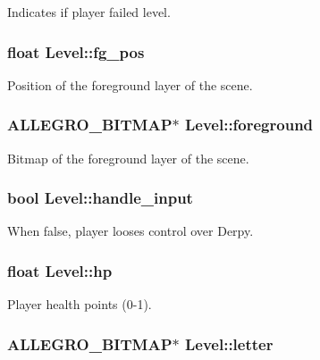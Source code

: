 \-Indicates if player failed level. \hypertarget{structLevel_a665bb93951ab6b7a91543712152a3acf}{
\subsubsection[{fg\-\_\-pos}]{\setlength{\rightskip}{0pt plus 5cm}float {\bf \-Level\-::fg\-\_\-pos}}}\label{structLevel_a665bb93951ab6b7a91543712152a3acf}
\-Position of the foreground layer of the scene. \hypertarget{structLevel_a26c758ccdc7404a3ee0e766d1cbbf0be}{
\subsubsection[{foreground}]{\setlength{\rightskip}{0pt plus 5cm}\-A\-L\-L\-E\-G\-R\-O\-\_\-\-B\-I\-T\-M\-A\-P$\ast$ {\bf \-Level\-::foreground}}}\label{structLevel_a26c758ccdc7404a3ee0e766d1cbbf0be}
\-Bitmap of the foreground layer of the scene. \hypertarget{structLevel_a06cf4f2da517284d2006540051d3e5c0}{
\subsubsection[{handle\-\_\-input}]{\setlength{\rightskip}{0pt plus 5cm}bool {\bf \-Level\-::handle\-\_\-input}}}\label{structLevel_a06cf4f2da517284d2006540051d3e5c0}
\-When false, player looses control over \-Derpy. \hypertarget{structLevel_a49df009e8113251cfcb48fe17df0b571}{
\subsubsection[{hp}]{\setlength{\rightskip}{0pt plus 5cm}float {\bf \-Level\-::hp}}}\label{structLevel_a49df009e8113251cfcb48fe17df0b571}
\-Player health points (0-\/1). \hypertarget{structLevel_af1b1699478b4633d76c01ea09e666df4}{
\subsubsection[{letter}]{\setlength{\rightskip}{0pt plus 5cm}\-A\-L\-L\-E\-G\-R\-O\-\_\-\-B\-I\-T\-M\-A\-P$\ast$ {\bf \-Level\-::letter}}}\label{structLevel_af1b1699478b4633d76c01ea09e666df4}
